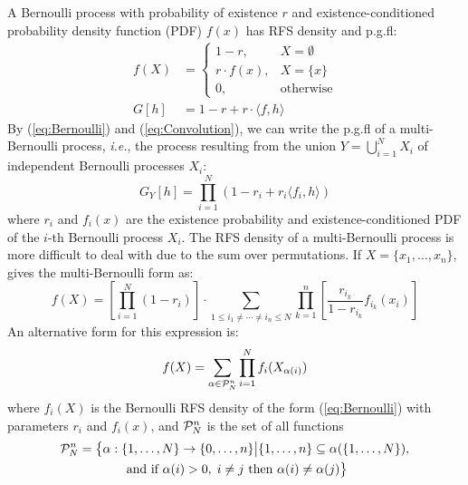 \documentclass[journal,twoside]{IEEEtran}
\theoremstyle{plain}
\begin{document}
A Bernoulli process with probability of existence $r$ and existence-conditioned probability density function (PDF) $f(x)$ has RFS density and p.g.fl: 
%
\begin{equation}\label{eq:Bernoulli}
\begin{split}
f(X) &= \begin{cases}
1-r, & X = \emptyset \\
r \cdot f(x), & X = \{x\} \\
0, & \mbox{otherwise}
\end{cases}  \\
G[h] &= 1 - r + r \cdot \langle f,h\rangle 
\end{split}
\end{equation}
%
By (\ref{eq:Bernoulli}) and (\ref{eq:Convolution}), we can write the p.g.fl of a multi-Bernoulli process, \textit{i.e.}\xspace, the process resulting from the union $Y=\bigcup_{i=1}^N X_i$ of independent Bernoulli processes $X_i$:
%
\begin{equation}\label{eq:MultiBernoulliPGFL}
G_Y[h] = \prod_{i=1}^N \left( 1 - r_i + r_i\langle f_i,h \rangle\right)
\end{equation}
%
where $r_i$ and $f_i(x)$ are the existence probability and existence-conditioned PDF of the $i$-th Bernoulli process $X_i$. The RFS density of a multi-Bernoulli process is more difficult to deal with due to the sum over permutations. If $X=\{x_1,\dots,x_n\}$, \cite[p368]{Mah07} gives the multi-Bernoulli form as:
%
\begin{equation}
f(X) = \left[\prod_{i=1}^N(1-r_i)\right]\cdot\sum_{1\leq i_1\neq\cdots\neq i_n\leq N} \prod_{k=1}^n\left[\frac{r_{i_k}}{1-r_{i_k}}f_{i_k}(x_i) \right]
\end{equation}
%
An alternative form for this expression is:
%
\begin{equation}\label{eq:MultiBernoulli}
f(X) = \sum_{\alpha\in{\cal P}_N^n}
\prod_{i=1}^N f_i(X_{\alpha(i)}) 
\end{equation}
%
where $f_i(X)$ is the Bernoulli RFS density of the form (\ref{eq:Bernoulli}) with parameters $r_i$ and $f_i(x)$, and ${\cal P}_N^n$ is the set of all functions 
%
\ifCLASSOPTIONdraftcls
\begin{multline}\label{eq:DefinitionP}
{\cal P}_N^n = \big\{\alpha : \{1,\dots,N\} \rightarrow \{0,\dots,n\} \big| 
\{1,\dots,n\}\subseteq\alpha(\{1,\dots,N\}), \\
\mbox{ and if } \alpha(i)>0,\; i\neq j \mbox{ then } \alpha(i)\neq\alpha(j)
\big\}
\end{multline}
\end{document}
